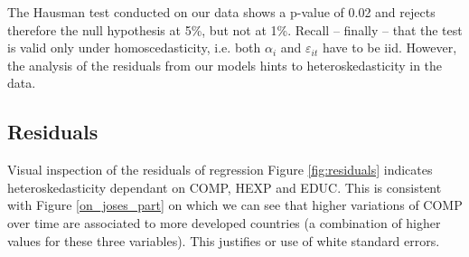 \documentclass[12pt,a4paper]{article}\usepackage[]{graphicx}\usepackage[]{color}
\begin{document}
The Hausman test conducted on our data shows a p-value of 0.02 and rejects therefore the null hypothesis at 5\%, but not at 1\%. Recall -- finally -- that the test is valid only under homoscedasticity, i.e. both $\alpha_i$ and $\varepsilon_{it}$ have to be iid. However, the analysis of the residuals from our models hints to heteroskedasticity in the data.


\subsection{Residuals}
Visual inspection of the residuals of regression Figure \ref{fig:residuals} indicates heteroskedasticity dependant on COMP, HEXP and EDUC. This is consistent with Figure \ref{on_joses_part} on which we can see that higher variations of COMP over time are associated to more developed countries (a combination of higher values for these three variables). This justifies or use of white standard errors.


\end{document}
